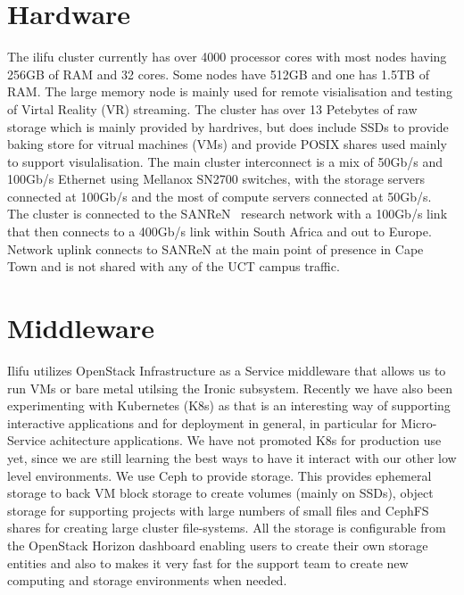 \documentclass[12pt,twocolumn,a4paper]{article}
\begin{document}


\section{Hardware}
\label{sec:hardware}



The ilifu cluster currently has over 4000 processor cores with most nodes having 256GB of RAM and 32 cores. 
Some nodes have 512GB 
and one has 1.5TB of RAM. The large memory node is mainly used for remote visialisation and testing of Virtal
Reality (VR) streaming. The cluster has over 13 Petebytes of raw storage which is mainly provided by hardrives, but 
does include SSDs to provide baking store for vitrual machines (VMs) and provide
POSIX shares used mainly
to support visulalisation. The main
 cluster interconnect is a mix of 50Gb/s and 100Gb/s Ethernet using Mellanox SN2700 switches, 
 with the storage servers connected at 100Gb/s and the 
most of compute servers connected at 50Gb/s. The cluster is connected to 
the SANReN~\cite{sanran} research network with a 100Gb/s link
that then connects to a 400Gb/s link within South Africa and out to Europe. Network uplink connects 
to SANReN at the main point of presence in Cape Town and is not shared
with any of the UCT campus traffic.


\section{Middleware}
\label{sec:middleware}

Ilifu utilizes OpenStack Infrastructure as a Service middleware that allows us to run VMs or bare metal
utilsing the Ironic subsystem. Recently we have also been experimenting with Kubernetes (K8s)
as that is an interesting way of supporting interactive applications and for deployment
in general, in particular for Micro-Service achitecture applications. We have not promoted K8s for
 production use yet, since we are still learning the best ways to have it interact with our
 other low level environments.
We use Ceph to provide storage. This provides ephemeral storage to back VM
block storage to create volumes (mainly on SSDs), object storage for supporting projects
with large numbers of small files and
CephFS shares for creating large cluster file-systems. All the storage is configurable from the 
OpenStack Horizon dashboard enabling users to create their own storage entities
and also to makes it very fast for the support team to create new computing
and storage environments when needed.
\end{document}
